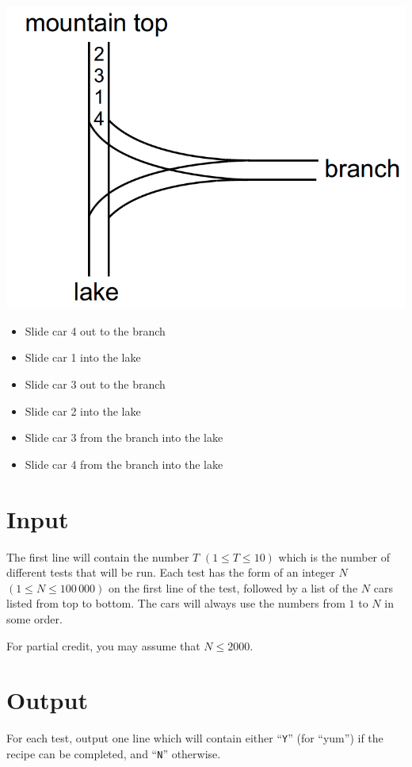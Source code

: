 \begin{minipage}{0.45\linewidth}
  \includegraphics[width=\linewidth]{confection2}
\end{minipage}
\hspace{0.05\linewidth}
\begin{minipage}{0.45\linewidth}
 \begin{itemize}
    \item Slide car 4 out to the branch
    \item Slide car 1 into the lake
    \item Slide car 3 out to the branch
    \item Slide car 2 into the lake
    \item Slide car 3 from the branch into the lake
    \item Slide car 4 from the branch into the lake
  \end{itemize}
\end{minipage}

\section*{Input}
The first line will contain the number $T$ $(1 \leq T \leq 10)$ which is the number of different tests
that will be run. Each test has the form of an integer $N$ $(1 \leq N \leq 100\,000)$ on the first
line of the test, followed by a list of the $N$ cars listed from top to bottom. The cars will always
use the numbers from $1$ to $N$ in some order.

For partial credit, you may assume that $N \leq 2000$.

\section*{Output}
For each test, output one line which will contain either ``\verb+Y+'' (for ``yum'') if the recipe can be
completed, and ``\verb+N+'' otherwise.
